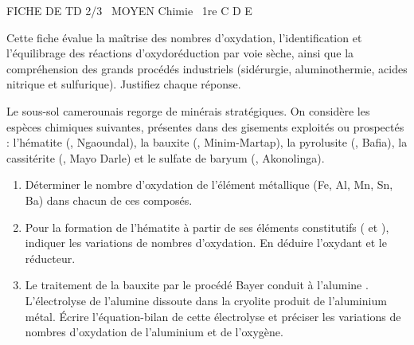 \documentclass[11pt]{article}
\begin{document}
\begin{tcolorbox}[enhanced,colback=popink,colframe=popink,arc=10pt,boxrule=0pt,left=12pt,right=12pt,top=9pt,bottom=9pt]
{\color{white}\popxbold\small FICHE DE TD 2/3 \textbullet\ MOYEN \hfill Chimie \textbullet\ 1re C D E\par}
\end{tcolorbox}
\vspace{4pt}
\noindent Cette fiche évalue la maîtrise des nombres d'oxydation, l'identification et l'équilibrage des réactions d'oxydoréduction par voie sèche, ainsi que la compréhension des grands procédés industriels (sidérurgie, aluminothermie, acides nitrique et sulfurique). Justifiez chaque réponse.

\begin{exercice}
Le sous-sol camerounais regorge de minérais stratégiques. On considère les espèces chimiques suivantes, présentes dans des gisements exploités ou prospectés : 
l'hématite (, Ngaoundal), la bauxite (, Minim-Martap), la pyrolusite (, Bafia), la cassitérite (, Mayo Darle) et le sulfate de baryum (, Akonolinga).
\begin{enumerate}
    \item Déterminer le nombre d'oxydation de l'élément métallique (Fe, Al, Mn, Sn, Ba) dans chacun de ces composés.
    \item Pour la formation de l'hématite à partir de ses éléments constitutifs ( et ), indiquer les variations de nombres d'oxydation. En déduire l'oxydant et le réducteur.
    \item Le traitement de la bauxite par le procédé Bayer conduit à l'alumine . L'électrolyse de l'alumine dissoute dans la cryolite produit de l'aluminium métal. Écrire l'équation-bilan de cette électrolyse et préciser les variations de nombres d'oxydation de l'aluminium et de l'oxygène.
\end{enumerate}
\end{exercice}
\end{document}
